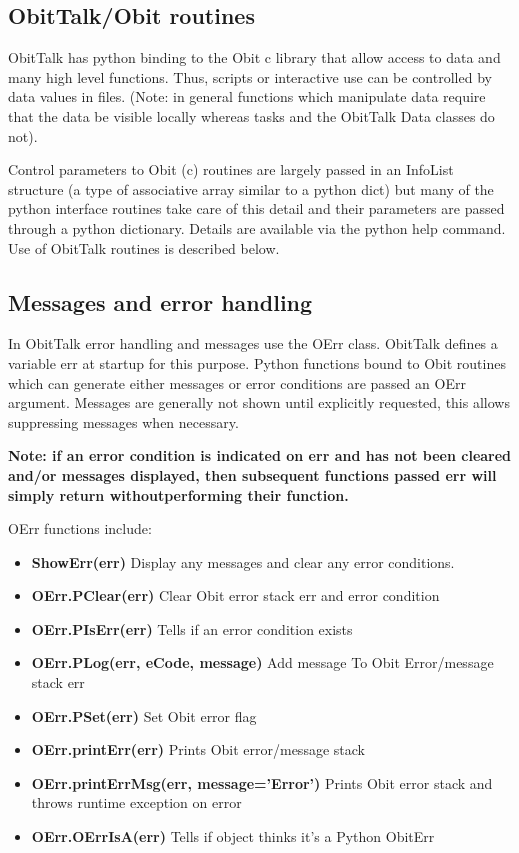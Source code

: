 \documentclass[11pt]{report}
\begin{document}
\subsection{ObitTalk/Obit routines}
ObitTalk has python binding to the Obit c library that allow access to
data and many high level functions.
Thus, scripts or interactive use can be controlled by data values in
files.
(Note: in general functions which manipulate data require that the
data be visible locally whereas tasks and the ObitTalk Data classes do
not). 

Control parameters to Obit (c) routines are largely passed in an
InfoList structure (a type of associative array similar to a python
dict) but many of the python interface routines take care of this
detail and their parameters are passed through a python dictionary.
Details are available via the python help command.
Use of ObitTalk routines is described below.

\subsection{Messages and error handling}
In ObitTalk error handling and messages use the OErr class.
ObitTalk defines a variable err at startup for this purpose.
Python functions bound to Obit routines which can generate either
messages or error conditions are passed an OErr argument.
Messages are generally not shown until explicitly requested, this
allows suppressing messages when necessary.

{\bf Note: if an error condition is indicated on err and has not been
cleared and/or messages displayed, then subsequent functions passed
err will simply return withoutperforming their function.}

OErr functions include:
\begin{itemize}
\item {\bf ShowErr(err)} Display any messages and clear any error conditions.
\item {\bf OErr.PClear(err)} Clear Obit error stack err and error condition
\item {\bf OErr.PIsErr(err)} Tells if an error condition exists
\item {\bf OErr.PLog(err, eCode, message)} Add message To Obit
Error/message stack err
\item {\bf OErr.PSet(err)} Set Obit error flag
\item {\bf OErr.printErr(err)} Prints Obit error/message stack
\item {\bf OErr.printErrMsg(err, message='Error')} Prints Obit error
stack and throws runtime exception on error 
\item {\bf OErr.OErrIsA(err)} Tells if object thinks it's a Python ObitErr
\end{itemize}
\end{document}
